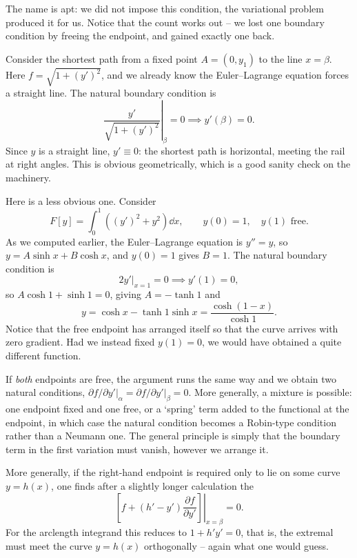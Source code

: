\documentclass[a4paper]{scrartcl}
\begin{document}
The name is apt: we did not impose this condition, the variational problem produced it for us. Notice that the count works out -- we lost one boundary condition by freeing the endpoint, and gained exactly one back.

\begin{example}
	Consider the shortest path from a fixed point $A = (0, y_1)$ to the line $x = \beta$. Here $f = \sqrt{1 + (y')^2}$, and we already know the Euler--Lagrange equation forces a straight line. The natural boundary condition is
	$$
	\left.\frac{y'}{\sqrt{1 + (y')^2}}\right|_{\beta} = 0 \implies y'(\beta) = 0.
	$$
	Since $y$ is a straight line, $y' \equiv 0$: the shortest path is horizontal, meeting the rail at right angles. This is obvious geometrically, which is a good sanity check on the machinery.
\end{example}

\begin{example}
	Here is a less obvious one. Consider
	$$
	F[y] = \int_0^1\left((y')^2 + y^2 \right)\dd x, \qquad y(0) = 1, \quad y(1) \text{ free}.
	$$
	As we computed earlier, the Euler--Lagrange equation is $y'' = y$, so $y = A\sinh x + B\cosh x$, and $y(0) = 1$ gives $B = 1$. The natural boundary condition is
	$$
	\left.2y'\right|_{x = 1} = 0 \implies y'(1) = 0,
	$$
	so $A\cosh 1 + \sinh 1 = 0$, giving $A = -\tanh 1$ and
	$$
	y = \cosh x - \tanh 1 \sinh x = \frac{\cosh(1 - x)}{\cosh 1}.
	$$
	Notice that the free endpoint has arranged itself so that the curve arrives with zero gradient. Had we instead fixed $y(1) = 0$, we would have obtained a quite different function.
\end{example}

If \emph{both} endpoints are free, the argument runs the same way and we obtain two natural conditions, $\left.\partial f/\partial y'\right|_\alpha = \left.\partial f/\partial y'\right|_\beta = 0$. More generally, a mixture is possible: one endpoint fixed and one free, or a `spring' term added to the functional at the endpoint, in which case the natural condition becomes a Robin-type condition rather than a Neumann one. The general principle is simply that the boundary term in the first variation must vanish, however we arrange it.

More generally, if the right-hand endpoint is required only to lie on some curve $y = h(x)$, one finds after a slightly longer calculation the 
$$
\left.\left[f + (h' - y')\frac{\partial f}{\partial y'}\right]\right|_{x = \beta} = 0.
$$
For the arclength integrand this reduces to $1 + h'y' = 0$, that is, the extremal must meet the curve $y = h(x)$ orthogonally -- again what one would guess.
\end{document}
